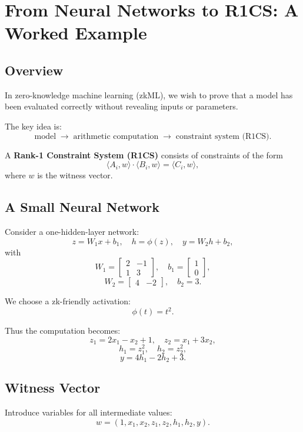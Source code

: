 \section{From Neural Networks to R1CS: A Worked Example}

\subsection{Overview}

In zero-knowledge machine learning (zkML), we wish to prove that a model has been evaluated correctly without revealing inputs or parameters.

The key idea is:
\[
\text{model} \;\longrightarrow\; \text{arithmetic computation} \;\longrightarrow\; \text{constraint system (R1CS)}.
\]

A \textbf{Rank-1 Constraint System (R1CS)} consists of constraints of the form
\[
\langle A_i, w \rangle \cdot \langle B_i, w \rangle = \langle C_i, w \rangle,
\]
where $w$ is the witness vector.

\subsection{A Small Neural Network}

Consider a one-hidden-layer network:
\[
z = W_1 x + b_1, \quad h = \phi(z), \quad y = W_2 h + b_2,
\]
with
\[
W_1 =
\begin{bmatrix}
2 & -1 \\
1 & 3
\end{bmatrix}, \quad
b_1 =
\begin{bmatrix}
1 \\
0
\end{bmatrix},
\]
\[
W_2 =
\begin{bmatrix}
4 & -2
\end{bmatrix}, \quad
b_2 = 3.
\]

We choose a zk-friendly activation:
\[
\phi(t) = t^2.
\]

Thus the computation becomes:
\[
z_1 = 2x_1 - x_2 + 1, \quad
z_2 = x_1 + 3x_2,
\]
\[
h_1 = z_1^2, \quad h_2 = z_2^2,
\]
\[
y = 4h_1 - 2h_2 + 3.
\]

\subsection{Witness Vector}

Introduce variables for all intermediate values:
\[
w = (1, x_1, x_2, z_1, z_2, h_1, h_2, y).
\]

